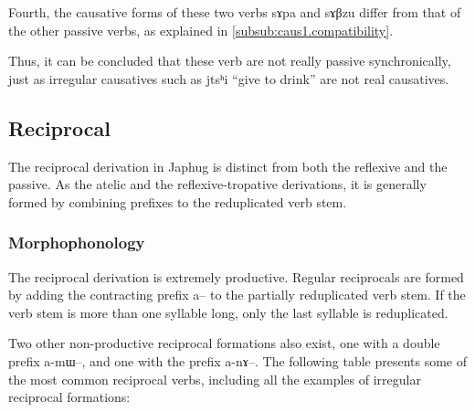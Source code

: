\documentclass[oldfontcommands,oneside,a4paper,11pt]{memoir}
\newcommand{\ipa}[1]{{\phon #1}} %
\begin{document}
Fourth, the causative forms of these two verbs \ipa{sɤpa} and \ipa{sɤβzu} differ from that of the other passive verbs, as explained in \ref{subsub:caus1.compatibility}.

Thus, it can be concluded that these verb are not really passive synchronically, just as irregular causatives such as \ipa{jtsʰi} ``give to drink'' are not real causatives.


\subsection{Reciprocal}  \label{sub:reciprocal}
The reciprocal derivation in Japhug is distinct from both the reflexive and the passive. As the atelic and the reflexive-tropative derivations, it is generally formed by combining prefixes to the reduplicated verb stem.
\subsubsection{Morphophonology} \label{subsub:recip.morpho}
The reciprocal derivation is extremely productive. Regular reciprocals are formed by adding the contracting prefix \ipa{a}-- to the partially reduplicated verb stem. If the verb stem is more than one syllable long, only the last syllable is reduplicated.

Two other non-productive reciprocal formations also exist, one with a double prefix \ipa{a-mɯ}--, and one with the prefix \ipa{a-nɤ}--. The following table presents some of the most common reciprocal verbs, including all the examples of irregular reciprocal formations:
\end{document}
